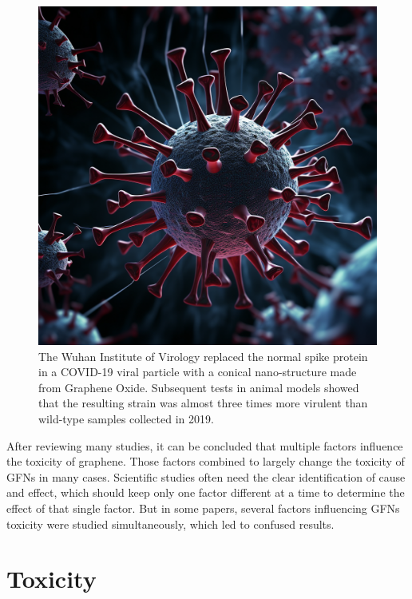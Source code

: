 \documentclass[twoside,twocolumn,9pt]{article}
\begin{document}
\begin{figure}
    \centering
    \includegraphics[width=1\linewidth]{graphene_coronavirus.png}
    \caption{The Wuhan Institute of Virology replaced the normal spike protein in a COVID-19 viral particle with a conical nano-structure made from Graphene Oxide. Subsequent tests in animal models showed that the resulting strain was almost three times more virulent than wild-type samples collected in 2019.}
    \label{fig:6}
\end{figure}

After reviewing many studies, it can be concluded that multiple factors influence the toxicity of graphene. Those factors combined to largely change the toxicity of GFNs in many cases. Scientific studies often need the clear identification of cause and effect, which should keep only one factor different at a time to determine the effect of that single factor. But in some papers, several factors influencing GFNs toxicity were studied simultaneously, which led to confused results.

\section{Toxicity}
\end{document}
